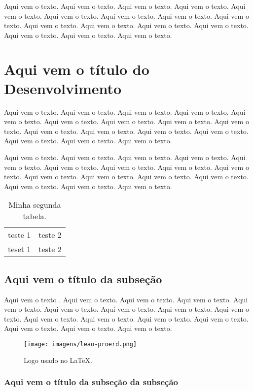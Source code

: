 \documentclass[a4paper, 12pt]{article}
\begin{document}
Aqui vem o texto. Aqui vem o texto. Aqui vem o texto. Aqui vem o texto.
Aqui vem o texto. Aqui vem o texto. Aqui vem o texto. Aqui vem o texto.
Aqui vem o texto. Aqui vem o texto. Aqui vem o texto. Aqui vem o texto.
Aqui vem o texto. Aqui vem o texto. Aqui vem o texto. Aqui vem o texto.

\section{Aqui vem o título do Desenvolvimento}

Aqui vem o texto. Aqui vem o texto. Aqui vem o texto. Aqui vem o texto.
Aqui vem o texto. Aqui vem o texto. Aqui vem o texto. Aqui vem o texto.
Aqui vem o texto. Aqui vem o texto. Aqui vem o texto. Aqui vem o texto.
Aqui vem o texto. Aqui vem o texto. Aqui vem o texto. Aqui vem o texto.

Aqui vem o texto. Aqui vem o texto. Aqui vem o texto. Aqui vem o texto.
Aqui vem o texto. Aqui vem o texto. Aqui vem o texto. Aqui vem o texto.
Aqui vem o texto. Aqui vem o texto. Aqui vem o texto. Aqui vem o texto.
Aqui vem o texto. Aqui vem o texto. Aqui vem o texto. Aqui vem o texto.

\begin{table}[htb]
 \centering
 \begin{tabular}{|c|c|}
  teste 1 & teste 2 \\
  teset 1 & teste 2 \\ 
 \end{tabular}
 \caption{Minha segunda tabela.}
 \label{minha-outra-tabela}
\end{table}

\subsection{Aqui vem o título da subseção}

Aqui vem o texto \cite{meuartigo}. Aqui vem o texto. Aqui vem o texto. Aqui vem o texto.
Aqui vem o texto. Aqui vem o texto. Aqui vem o texto. Aqui vem o texto.
Aqui vem o texto. Aqui vem o texto. Aqui vem o texto. Aqui vem o texto.
Aqui vem o texto. Aqui vem o texto. Aqui vem o texto. Aqui vem o texto.

\begin{figure}[htb]
 \centering
 \texttt{[image: imagens/leao-proerd.png]}
 \caption{Logo usado no \LaTeX.}
 \label{figura-leao}
\end{figure}

\subsubsection{Aqui vem o título da subseção da subseção}
\end{document}
